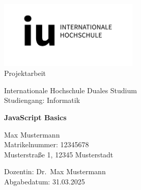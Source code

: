 \begin{titlepage}
  \begin{center}
      \includegraphics[width=0.50\textwidth]{./assets/iu-logo.png} \\
      
      \large Projektarbeit \\
      \vspace{1cm}
      
      \large Internationale Hochschule Duales Studium \\
      \large Studiengang: Informatik \\
      \vspace{1.5cm}
      
      \textbf{\Large{JavaScript Basics}} \\
      \vspace{2cm}
      
      \large Max Mustermann \\
      \large Matrikelnummer: 12345678 \\
      \large Musterstraße 1, 12345 Musterstadt \\
      \vspace{1.5cm}
      
      \large Dozentin: Dr.\ Max Mustermann \\
      \large Abgabedatum: 31.03.2025
  \end{center}
\end{titlepage}